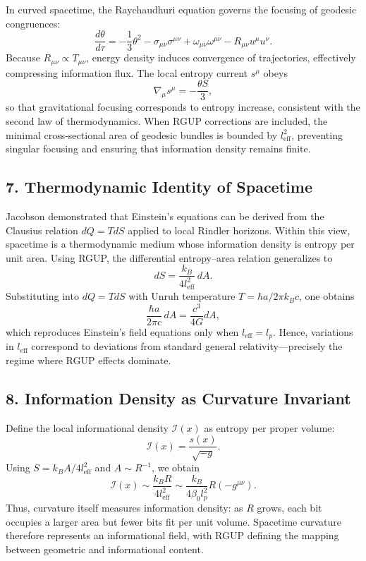 \documentclass[11pt,oneside]{book}
\numberwithin{equation}{chapter}
\newcommand{\betaz}{\beta_0}
\begin{document}
In curved spacetime, the Raychaudhuri equation governs the focusing of geodesic congruences:
\begin{equation}
\frac{d\theta}{d\tau} 
= -\frac{1}{3}\theta^2 - \sigma_{\mu\nu}\sigma^{\mu\nu}
+ \omega_{\mu\nu}\omega^{\mu\nu}
- R_{\mu\nu}u^\mu u^\nu.
\end{equation}
Because $R_{\mu\nu}\propto T_{\mu\nu}$, energy density induces convergence of trajectories, effectively compressing information flux.  
The local entropy current $s^\mu$ obeys
\begin{equation}
\nabla_\mu s^\mu = -\frac{\theta S}{3},
\end{equation}
so that gravitational focusing corresponds to entropy increase, consistent with the second law of thermodynamics.  
When RGUP corrections are included, the minimal cross-sectional area of geodesic bundles is bounded by $l_{\text{eff}}^2$, preventing singular focusing and ensuring that information density remains finite.

\subsection*{7. Thermodynamic Identity of Spacetime}

Jacobson demonstrated that Einstein’s equations can be derived from the Clausius relation $dQ = T dS$ applied to local Rindler horizons.  
Within this view, spacetime is a thermodynamic medium whose information density is entropy per unit area.  
Using RGUP, the differential entropy–area relation generalizes to
\begin{equation}
dS = \frac{k_B}{4 l_{\text{eff}}^2}\,dA.
\end{equation}
Substituting into $dQ = T dS$ with Unruh temperature $T = \hbar a / 2\pi k_B c$, one obtains
\begin{equation}
\frac{\hbar a}{2\pi c}\,dA
= \frac{c^3}{4G}dA,
\end{equation}
which reproduces Einstein’s field equations only when $l_{\text{eff}}=l_p$.  
Hence, variations in $l_{\text{eff}}$ correspond to deviations from standard general relativity—precisely the regime where RGUP effects dominate.

\subsection*{8. Information Density as Curvature Invariant}

Define the local informational density $\mathcal{I}(x)$ as entropy per proper volume:
\begin{equation}
\mathcal{I}(x) = \frac{s(x)}{\sqrt{-g}}.
\end{equation}
Using $S = k_B A / 4l_{\text{eff}}^2$ and $A\sim R^{-1}$, we obtain
\begin{equation}
\mathcal{I}(x) \sim 
\frac{k_B R}{4 l_{\text{eff}}^2}
\sim
\frac{k_B}{4\betaz l_p^2}
R (-g^{\mu\nu}).
\end{equation}
Thus, curvature itself measures information density: as $R$ grows, each bit occupies a larger area but fewer bits fit per unit volume.  
Spacetime curvature therefore represents an informational field, with RGUP defining the mapping between geometric and informational content.
\end{document}
